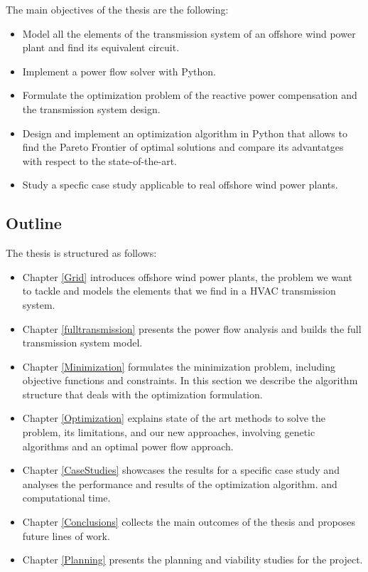 \documentclass[a4paper,11pt, titlepage, twoside]{article}
\begin{document}
The main objectives of the thesis are the following:
\begin{itemize}
    \item Model all the elements of the transmission system of an offshore wind power plant and find its equivalent circuit.
    \item Implement a power flow solver with Python.
    \item Formulate the optimization problem of the reactive power compensation and the transmission system design. 
    \item Design and implement an optimization algorithm in Python that allows to find the Pareto Frontier of optimal solutions and compare its advantatges with respect to the state-of-the-art.
    \item Study a specfic case study applicable to real offshore wind power plants.
  \end{itemize}


\subsection{Outline}

The thesis is structured as follows:
\begin{itemize}
    \item Chapter \ref{Grid} introduces offshore wind power plants, the problem we want to tackle and models the elements that we find in a HVAC transmission system.
    \item Chapter \ref{fulltransmission} presents the power flow analysis and builds the full transmission system model. 
    \item Chapter \ref{Minimization}  formulates the minimization problem, including objective functions and constraints. In this section we describe
    the algorithm structure that deals with the optimization formulation.
    \item Chapter \ref{Optimization} explains state of the art methods to solve the problem, its limitations, and our new approaches, involving
    genetic algorithms and  an optimal power flow approach.
    \item Chapter \ref{CaseStudies} showcases  the results for a specific case study and analyses the performance and results of the optimization algorithm.
    and computational time.
    \item Chapter \ref{Conclusions} collects the main outcomes of the thesis and proposes future lines of work.
    \item Chapter \ref{Planning} presents the planning and viability studies for the project.
\end{itemize}
\end{document}
